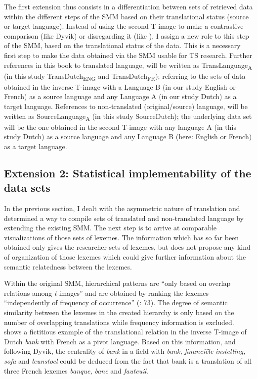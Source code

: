 The first extension thus consists in a differentiation between sets of retrieved data within the different steps of the SMM based on their translational status (source or target language). Instead of using the second T-image to make a contrastive comparison (like Dyvik) or disregarding it (like \citealt{aijmer_model_2004}), I assign a new role to this step of the SMM, based on the translational status of the data. This is a necessary first step to make the data obtained via the SMM usable for TS research. Further references in this book to translated language, will be written as TransLanguage\textsubscript{A} (in this study TransDutch\textsubscript{ENG} and TransDutch\textsubscript{FR}); referring to the sets of data obtained in the inverse T-image with a Language B (in our study English or French) as a source language and any Language A (in our study Dutch) as a target language. References to non-translated (original/source) language, will be written as SourceLanguage\textsubscript{A} (in this study SourceDutch); the underlying data set will be the one obtained in the second T-image with any language A (in this study Dutch) as a source language and any Language B (here: English or French) as a target language.


\subsection{\label{sec:3.5.2}  Extension 2: Statistical implementability of the data sets}

In the previous section, I dealt with the asymmetric nature of translation and determined a way to compile sets of translated and non-translated language by extending the existing SMM. The next step is to arrive at comparable visualizations of those sets of lexemes. The information which has so far been obtained only gives the researcher sets of lexemes, but does not propose any kind of organization of those lexemes which could give further information about the semantic relatedness between the lexemes.



Within the original SMM, hierarchical patterns are “only based on overlap relations among \textit{t-}images” and are obtained by ranking the lexemes “independently of frequency of occurrence” (\citealt{johansson_translational_1998}: 73). The degree of semantic similarity between the lexemes in the created hierarchy is only based on the number of overlapping translations while frequency information is excluded.  shows a fictitious example of the translational relation in the inverse T-image of Dutch \textit{bank} with French as a pivot language. Based on this information, and following Dyvik, the centrality of \textit{bank} in a field with \textit{bank,} \textit{financiële} \textit{instelling,} \textit{sofa} and \textit{leunstoel} could be deduced from the fact that bank is a translation of all three French lexemes \textit{banque,} \textit{banc} and \textit{fauteuil}.


